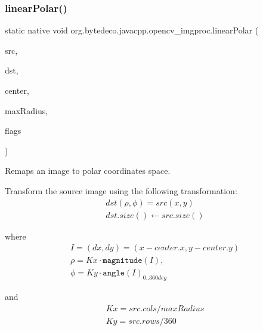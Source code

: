 \subsubsection{\texorpdfstring{linear\+Polar()}{linearPolar()}}
{\footnotesize\ttfamily static native void org.\+bytedeco.\+javacpp.\+opencv\+\_\+imgproc.\+linear\+Polar (\begin{DoxyParamCaption}\item[{@By\+Val Mat}]{src,  }\item[{@By\+Val Mat}]{dst,  }\item[{@By\+Val Point2f}]{center,  }\item[{double}]{max\+Radius,  }\item[{int}]{flags }\end{DoxyParamCaption})\hspace{0.3cm}{\ttfamily [static]}}



Remaps an image to polar coordinates space. 

\label{group__imgproc__transform_polar_remaps_reference_image}%
%
 

Transform the source image using the following transformation\+: \[\begin{array}{l} dst( \rho , \phi ) = src(x,y) \\ dst.size() \leftarrow src.size() \end{array}\] 

where \[\begin{array}{l} I = (dx,dy) = (x - center.x,y - center.y) \\ \rho = Kx \cdot \texttt{magnitude} (I) ,\\ \phi = Ky \cdot \texttt{angle} (I)_{0..360 deg} \end{array}\] 

and \[\begin{array}{l} Kx = src.cols / maxRadius \\ Ky = src.rows / 360 \end{array}\] 


